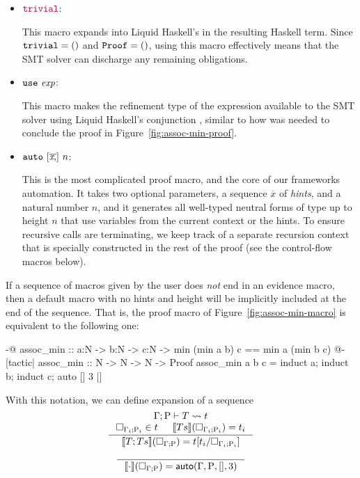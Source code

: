 \begin{itemize}

\item ${\color{purple}\mathtt{trivial}}$:

  This macro expands into Liquid Haskell's  in
  the resulting Haskell term. Since $\mathtt{trivial} = \mathtt{()}$ and
  $\mathtt{Proof} = \mathtt{()}$, using this macro effectively means that the
  SMT solver can discharge any remaining obligations.

\item $\mathtt{use} ~ \textit{exp}$:

  This macro makes the refinement type of the expression available to
  the SMT solver using Liquid Haskell's conjunction \LC{&&&}, similar
  to how  was needed to conclude the proof in
  Figure~\ref{fig:assoc-min-proof}.
  
\item $\mathtt{auto} ~ [\overline{\textit{x} ,}] ~ n$:

  This is the most complicated proof macro, and the core of our
  frameworks automation. It takes two optional parameters, a sequence
  $\overline{\textit{x}}$ of {\em hints}, and a natural number $n$,
  and it generates all well-typed neutral forms of type  up
  to height $n$ that use variables from the current context or the
  hints. To ensure recursive calls are terminating, we keep track of a
  separate recursion context that is specially constructed in the rest
  of the proof (see the control-flow macros below).
\end{itemize}

If a sequence of macros given by the user does {\em not} end in an
evidence macro, then a default  macro with no hints and height
 will be implicitly included at the end of the sequence. That is,
the proof macro of Figure~\ref{fig:assoc-min-macro} is equivalent to
the following one:
\begin{code}
  {-@ assoc_min :: a:N -> b:N -> c:N ->
        {min (min a b) c == min a (min b c)} @-}
  [tactic|
    assoc_min :: N -> N -> N -> Proof
    assoc_min a b c = induct a; induct b; induct c; auto [] 3
  |]
\end{code}




With this notation, we can define expansion of a sequence 
\[
  \inference
      { \Expand{\Gamma}{\Rho}{T}{t}\\
            \macroHole{\Gamma_i}{\Rho_i} \in t && 
            \Sem{Ts}{\macroHole{\Gamma_i}{\Rho_i}}{t_i}
          }
      { \Sem{T;Ts}{\macroHole{\Gamma}{\Rho}}{t[t_i/\macroHole{\Gamma_i}{\Rho_i}]}}
\]
\[
\begin{array}{c}
  \inference{}{\Sem{\cdot}{\macroHole{\Gamma}{\Rho}}
    {\mathsf{auto}(\Gamma, \Rho, [], 3)}} \\
  \\
\end{array}
\]









